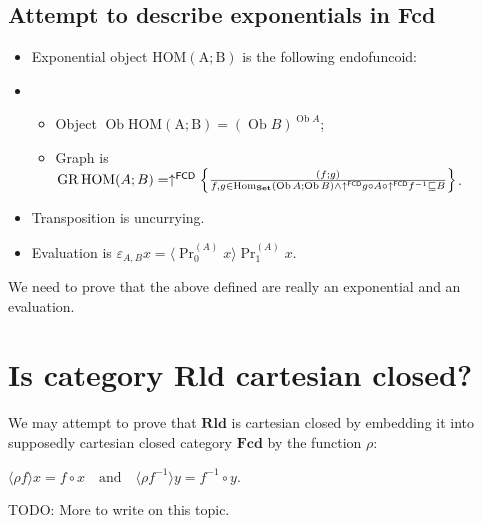 \subsection{Attempt to describe exponentials in Fcd}

\begin{itemize}
\item Exponential object $\operatorname{HOM(A;B)}$ is the following endofuncoid:
\item\begin{itemize}
\item Object $\operatorname{Ob}\operatorname{HOM(A;B)} = (\operatorname{Ob} B)^{\operatorname{Ob} A}$;
\item Graph is $\operatorname{GR} \operatorname{HOM} ( A ; B) = \uparrow^{\mathsf{FCD}} \left\{ \frac{ ( f ; g) }{ f, g \in \operatorname{Hom}_{\mathbf{Set}} (\operatorname{Ob} A;\operatorname{Ob} B) \wedge \uparrow^{\mathsf{FCD}}g \circ A \circ \uparrow^{\mathsf{FCD}}f^{- 1} \sqsubseteq B }\right\}$.
\end{itemize}
\item Transposition is uncurrying.
\item Evaluation is $\varepsilon_{A, B} x = \langle \operatorname{Pr}^{(A)}_0 x \rangle \operatorname{Pr}^{(A)}_1 x$.
\end{itemize}

We need to prove that the above defined are really an exponential and an evaluation.

\section{Is category Rld cartesian closed?}

We may attempt to prove that $\mathbf{Rld}$ is cartesian closed by embedding it into supposedly cartesian closed category $\mathbf{Fcd}$ by the function $\rho$:

$\langle \rho f \rangle x = f \circ x \quad \text{and} \quad \langle \rho f^{- 1} \rangle y = f^{- 1} \circ y$.

TODO: More to write on this topic.